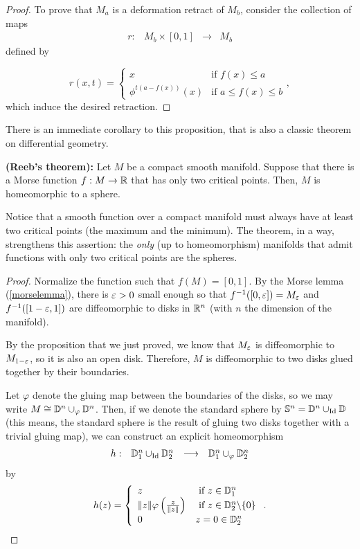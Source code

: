 \begin{proof}
To prove that $M_a$ is a deformation retract of $M_b$, consider the collection of maps
$$\begin{array}{rccc} r : & M_b \times [0,1] & \longrightarrow & M_b \end{array}$$
defined by

$$r(x,t) = \left\{ \begin{array}{ll} x & \text{if } f(x) \leq a \\ \phi^{t(a-f(x))}(x) & \text{if } a \leq f(x) \leq b \end{array} \right. ,$$
which induce the desired retraction.
\end{proof}

There is an immediate corollary to this proposition, that is also a classic theorem on differential geometry.

\begin{coro} {\bf (Reeb's theorem):} Let $M$ be a compact smooth manifold. Suppose that there is a Morse function $f : M \rightarrow \mathbb{R}$ that has only two critical points. Then, $M$ is homeomorphic to a sphere.\end{coro}

\begin{rmrk} Notice that a smooth function over a compact manifold must always have at least two critical points (the maximum and the minimum). The theorem, in a way, strengthens this assertion: the {\it only} (up to homeomorphism) manifolds that admit functions with only two critical points are the spheres.
\end{rmrk}

\begin{proof}
Normalize the function such that $f(M) = [0,1]$. By the Morse lemma (\ref{morselemma}), there is $\varepsilon > 0$ small enough so that $f^{-1}([0,\varepsilon]) = M_{\varepsilon}$ and $f^{-1}([1-\varepsilon,1])$ are diffeomorphic to disks in $\mathbb{R}^n$ (with $n$ the dimension of the manifold).

By the proposition that we just proved, we know that $M_{\varepsilon}$ is diffeomorphic to $M_{1-\varepsilon}$, so it is also an open disk. Therefore, $M$ is diffeomorphic to two disks glued together by their boundaries.

Let $\varphi$ denote the gluing map between the boundaries of the disks, so we may write $M \cong \mathbb{D}^n \cup_{\varphi} \mathbb{D}^n$. Then, if we denote the standard sphere by $\mathbb{S}^n = \mathbb{D}^n \cup_{\text{Id}} \mathbb{D}$ (this means, the standard sphere is the result of gluing two disks together with a trivial gluing map), we can construct an explicit homeomorphism
$$\begin{array}{rccc} h : & \mathbb{D}_1^n \cup_{\text{Id}} \mathbb{D}_2^n & \longrightarrow & \mathbb{D}_1^n \cup_{\varphi} \mathbb{D}_2^n \end{array}$$
by
$$h(z) = \left\{ \begin{array}{ll} z & \text{ if } z \in \mathbb{D}_1^n \\ \|z\| \varphi\left( \frac{z}{\|z\|} \right) & \text{ if } z \in \mathbb{D}_2^n \backslash \{0\} \\ 0 & z = 0 \in \mathbb{D}_2^n \end{array} \right. .$$
\end{proof}

